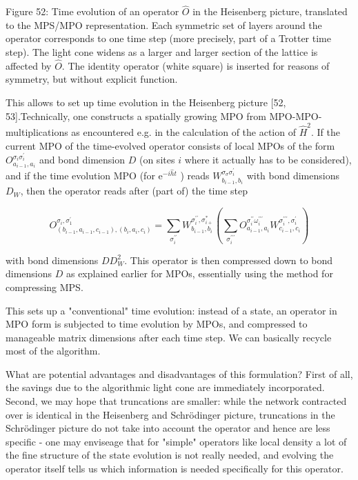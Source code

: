 \documentclass[12pt]{article}
\begin{document}
Figure 52: Time evolution of an operator $\hat{O}$ in the Heisenberg picture, translated to the MPS/MPO representation. Each symmetric set of layers around the operator corresponds to one time step (more precisely, part of a Trotter time step). The light cone widens as a larger and larger section of the lattice is affected by $\hat{O}$. The identity operator (white square) is inserted for reasons of symmetry, but without explicit function.

This allows to set up time evolution in the Heisenberg picture [52, 53].Technically, one constructs a spatially growing MPO from MPO-MPO-multiplications as encountered e.g. in the calculation of the action of $\hat{H}^{2}$. If the current MPO of the time-evolved operator consists of local MPOs of the form $O_{a_{i-1}, a_{i}}^{\sigma_{i} \sigma_{i}^{\prime}}$ and bond dimension $D$ (on sites $i$ where it actually has to be considered), and if the time evolution MPO (for $\mathrm{e}^{-i \hat{h} t}$ ) reads $W_{b_{i-1}, b_{i}}^{\sigma_{\sigma} \sigma_{i}^{\prime}}$ with bond dimensions $D_{W}$, then the operator reads after (part of) the time step


\begin{equation*}
O_{\left(b_{i-1}, a_{i-1}, c_{i-1}\right),\left(b_{i}, a_{i}, c_{i}\right)}^{\sigma_{i}, \sigma_{1}^{\prime}}=\sum_{\sigma_{i}^{\prime \prime}} W_{b_{i-1}, b_{i}}^{\sigma_{i}^{\prime \prime}, \sigma_{i+}^{*}}\left(\sum_{\sigma_{i}^{\prime \prime \prime}} O_{a_{i-1}, a_{i}}^{\sigma_{i}^{\prime \prime} \omega_{i}^{\prime \prime \prime}} W_{c_{i-1}, c_{i}}^{\sigma_{i}^{\prime \prime \prime}, \sigma_{i}^{\prime}}\right) \tag{283}
\end{equation*}


with bond dimensions $D D_{W}^{2}$. This operator is then compressed down to bond dimensions $D$ as explained earlier for MPOs, essentially using the method for compressing MPS.

This sets up a "conventional" time evolution: instead of a state, an operator in MPO form is subjected to time evolution by MPOs, and compressed to manageable matrix dimensions after each time step. We can basically recycle most of the algorithm.

What are potential advantages and disadvantages of this formulation? First of all, the savings due to the algorithmic light cone are immediately incorporated. Second, we may hope that truncations are smaller: while the network contracted over is identical in the Heisenberg and Schrödinger picture, truncations in the Schrödinger picture do not take into account the operator and hence are less specific - one may enviseage that for "simple" operators like local density a lot of the fine structure of the state evolution is not really needed, and evolving the operator itself tells us which information is needed specifically for this operator.
\end{document}
